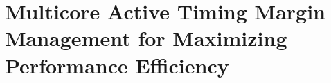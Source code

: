 
\chapter{Multicore Active Timing Margin Management for Maximizing Performance Efficiency}
\label{sec:multicore}